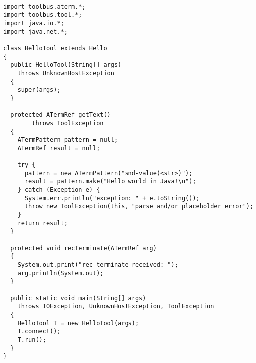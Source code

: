 \begin{verbatim}

import toolbus.aterm.*;
import toolbus.tool.*;
import java.io.*;
import java.net.*;

class HelloTool extends Hello
{
  public HelloTool(String[] args) 
    throws UnknownHostException
  {
    super(args);
  }

  protected ATermRef getText() 
        throws ToolException
  {
    ATermPattern pattern = null;
    ATermRef result = null;

    try {
      pattern = new ATermPattern("snd-value(<str>)");
      result = pattern.make("Hello world in Java!\n"); 
    } catch (Exception e) {
      System.err.println("exception: " + e.toString());
      throw new ToolException(this, "parse and/or placeholder error");
    }
    return result;
  }

  protected void recTerminate(ATermRef arg)
  {
    System.out.print("rec-terminate received: ");
    arg.println(System.out);
  }

  public static void main(String[] args)
    throws IOException, UnknownHostException, ToolException
  {
    HelloTool T = new HelloTool(args);
    T.connect();
    T.run();
  }
}
\end{verbatim}
